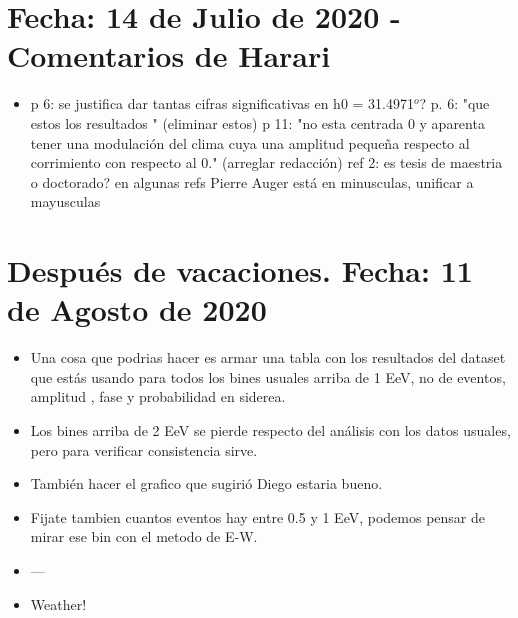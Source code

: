 \section{Fecha: 14 de Julio de 2020 - Comentarios de Harari}

\begin{itemize}
\done pag 2: no diría $\theta_{max} < 60^o$, diría $\theta < 60^o$ (o $\theta_max=60^o$)
\done p 2: la frase "la eficiencia completa se alcanza a partir de una energía mayor cercana a 1 EeV" me parece algo confusa, no queda claro si queres decir que la eficiencia completa es a energias mayores que 1 EeV u otra cosa, lo relevante seria destacar que el umbral de eficiencia completa es menor que con el disparo estandar  
\item p 6: se justifica dar tantas cifras significativas en  h0 = 31.4971$^o$? 
\done p. 6: "que estos los resultados "  (eliminar estos) 
\done p 11: "no esta centrada 0 y aparenta tener una modulación del clima cuya una amplitud pequeña respecto al corrimiento con respecto al 0." (arreglar redacción) 
\done ref 2: es tesis de maestria o doctorado? 
\done en algunas refs Pierre Auger está en minusculas, unificar a  mayusculas
\end{itemize}



\section{Después de vacaciones. Fecha: 11 de Agosto de 2020}

\begin{itemize}
	\item Una cosa que podrias hacer es armar una tabla con los resultados del dataset que estás usando para todos los bines usuales arriba de 1 EeV, no de eventos, amplitud , fase y probabilidad en siderea. 
	
	\item Los bines arriba de 2  EeV se pierde respecto del análisis con los datos usuales, pero para verificar consistencia sirve.
	
	\item También hacer el grafico que sugirió Diego estaria bueno.
	
	\item Fijate tambien cuantos eventos hay entre 0.5 y 1 EeV, podemos pensar de mirar ese bin con el metodo de E-W.
	
	\item --- 
	
	\item Weather!

\end{itemize}